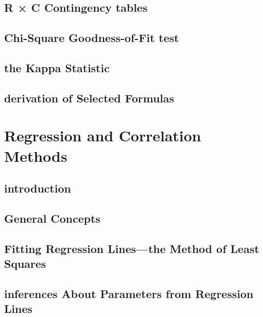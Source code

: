 \documentclass[12pt,]{article}
\begin{document}
\hypertarget{r-c-contingency-tables}{%
\subsection{R × C Contingency tables}\label{r-c-contingency-tables}}

\hypertarget{chi-square-goodness-of-fit-test}{%
\subsection{Chi-Square Goodness-of-Fit
test}\label{chi-square-goodness-of-fit-test}}

\hypertarget{the-kappa-statistic}{%
\subsection{the Kappa Statistic}\label{the-kappa-statistic}}

\hypertarget{derivation-of-selected-formulas}{%
\subsection{derivation of Selected
Formulas}\label{derivation-of-selected-formulas}}

\hypertarget{regression-and-correlation-methods}{%
\section{Regression and Correlation
Methods}\label{regression-and-correlation-methods}}

\hypertarget{introduction-7}{%
\subsection{introduction}\label{introduction-7}}

\hypertarget{general-concepts-2}{%
\subsection{General Concepts}\label{general-concepts-2}}

\hypertarget{fitting-regression-linesthe-method-of-least-squares}{%
\subsection{Fitting Regression Lines---the Method of Least
Squares}\label{fitting-regression-linesthe-method-of-least-squares}}

\hypertarget{inferences-about-parameters-from-regression-lines}{%
\subsection{inferences About Parameters from Regression
Lines}\label{inferences-about-parameters-from-regression-lines}}
\end{document}

